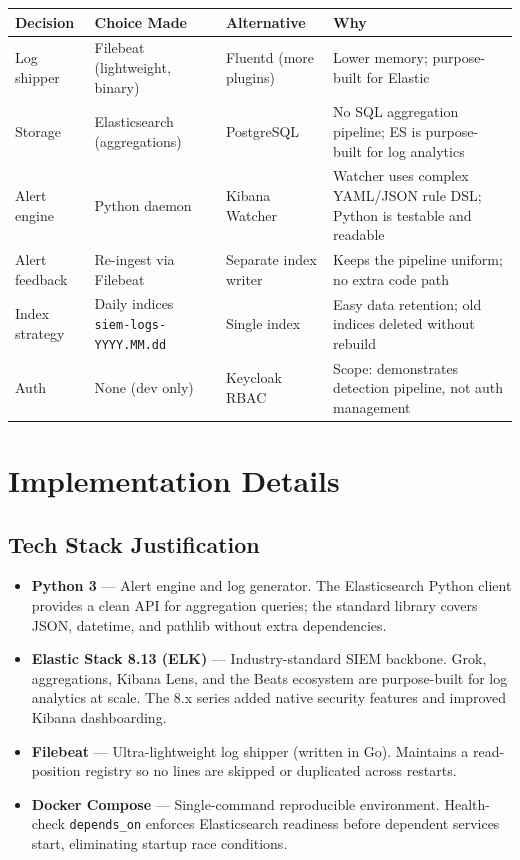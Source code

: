 \documentclass[12pt,a4paper]{article}
\begin{document}
\begin{center}
\begin{tabular}{p{3cm}p{4.5cm}p{4cm}p{2cm}}
  \toprule
  \textbf{Decision} & \textbf{Choice Made} & \textbf{Alternative} & \textbf{Why} \\
  \midrule
  Log shipper      & Filebeat (lightweight, binary) & Fluentd (more plugins) & Lower memory; purpose-built for Elastic \\
  Storage          & Elasticsearch (aggregations) & PostgreSQL & No SQL aggregation pipeline; ES is purpose-built for log analytics \\
  Alert engine     & Python daemon & Kibana Watcher & Watcher uses complex YAML/JSON rule DSL; Python is testable and readable \\
  Alert feedback   & Re-ingest via Filebeat & Separate index writer & Keeps the pipeline uniform; no extra code path \\
  Index strategy   & Daily indices \texttt{siem-logs-YYYY.MM.dd} & Single index & Easy data retention; old indices deleted without rebuild \\
  Auth             & None (dev only) & Keycloak RBAC & Scope: demonstrates detection pipeline, not auth management \\
  \bottomrule
\end{tabular}
\end{center}

\newpage

\section{Implementation Details}

\subsection{Tech Stack Justification}

\begin{itemize}[leftmargin=2em]
  \item \textbf{Python 3} — Alert engine and log generator. The Elasticsearch
        Python client provides a clean API for aggregation queries; the
        standard library covers JSON, datetime, and pathlib without extra
        dependencies.
  \item \textbf{Elastic Stack 8.13 (ELK)} — Industry-standard SIEM backbone.
        Grok, aggregations, Kibana Lens, and the Beats ecosystem are
        purpose-built for log analytics at scale. The 8.x series added native
        security features and improved Kibana dashboarding.
  \item \textbf{Filebeat} — Ultra-lightweight log shipper (written in Go).
        Maintains a read-position registry so no lines are skipped or
        duplicated across restarts.
  \item \textbf{Docker Compose} — Single-command reproducible environment.
        Health-check \texttt{depends\_on} enforces Elasticsearch readiness
        before dependent services start, eliminating startup race conditions.
\end{itemize}
\end{document}
